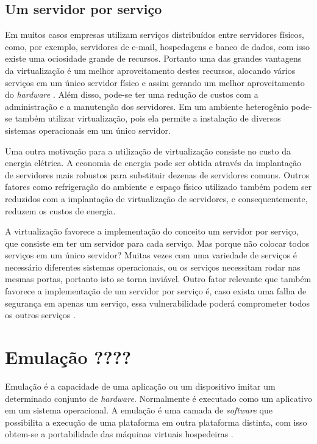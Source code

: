 \subsection{Um servidor por serviço}
\label{section:virtserv}

Em muitos casos empresas utilizam serviços distribuídos entre servidores físicos, como, por exemplo, servidores de e-mail, hospedagens e 
banco de dados, com isso existe uma ociosidade grande de recursos. Portanto uma das grandes vantagens da virtualização é um melhor 
aproveitamento destes recursos, alocando vários serviços em um único servidor físico e assim gerando um melhor aproveitamento do \textit{hardware} 
\cite{moreira2006}. Além disso, pode-se ter uma redução de custos com a administração e a manutenção dos servidores. Em um ambiente 
heterogênio pode-se também utilizar virtualização, pois ela permite a instalação de diversos sistemas operacionais em um único servidor.

Uma outra motivação para a utilização de virtualização consiste no custo da energia elétrica. A economia de energia pode ser obtida através 
da implantação de servidores mais robustos para substituir dezenas de servidores comuns. Outros fatores como refrigeração do ambiente e 
espaço físico utilizado também podem ser reduzidos com a implantação de virtualização de servidores, e consequentemente, reduzem os 
custos de energia.

A virtualização favorece a implementação do conceito um servidor por serviço, que consiste em ter um servidor para cada serviço.
Mas porque não colocar todos serviços em um único servidor? Muitas vezes com uma variedade de serviços é necessário diferentes 
sistemas operacionais, ou os serviços necessitam rodar nas mesmas portas, portanto isto se torna inviável. Outro fator relevante que 
também favorece a implementação de um servidor por serviço é, caso exista uma falha de segurança em apenas um serviço, essa 
vulnerabilidade poderá comprometer todos os outros serviços \cite{carissimi2008}.

\section{Emulação ????}

Emulação é a capacidade de uma aplicação ou um dispositivo imitar um determinado conjunto de \textit{hardware}. Normalmente é
executado como um aplicativo em um sistema operacional. A emulação é uma camada de \textit{software} que possibilita a execução
de uma plataforma em outra plataforma distinta, com isso obtem-se a portabilidade das máquinas virtuais hospedeiras \cite{silva2009}.

